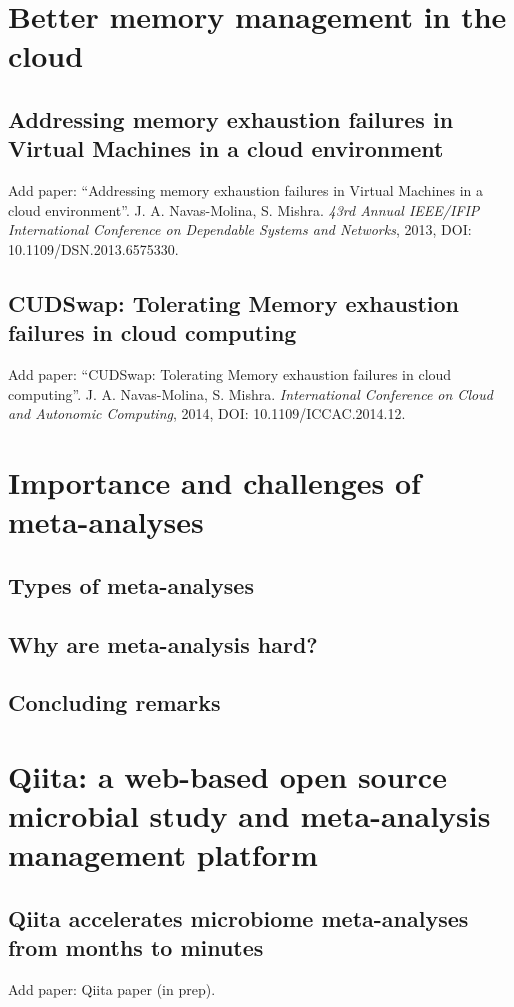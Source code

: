 \documentclass[12pt,chapterheads]{ucsd}
\begin{document}
\chapter{Better memory management in the cloud}\label{chapter_cudswap}
\glsresetall
% 
% 
\section{Addressing memory exhaustion failures in Virtual Machines in a cloud environment}\label{section_memory_exhaustion}
Add paper: ``Addressing memory exhaustion failures in Virtual Machines in a cloud environment''. J. A. Navas-Molina, S. Mishra. \emph{43rd Annual IEEE/IFIP International Conference on Dependable Systems and Networks}, 2013, DOI: 10.1109/DSN.2013.6575330.
\section{CUDSwap: Tolerating Memory exhaustion failures in cloud computing}\label{section_cudswap}
Add paper: ``CUDSwap: Tolerating Memory exhaustion failures in cloud computing''. J. A. Navas-Molina, S. Mishra. \emph{International Conference on Cloud and Autonomic Computing}, 2014, DOI: 10.1109/ICCAC.2014.12.

\chapter{Importance and challenges of meta-analyses}\label{chapter_meta}
\glsresetall
\section{Types of meta-analyses}\label{section_meta}
\section{Why are meta-analysis hard?}\label{section_meta_hard}
\section{Concluding remarks}\label{section_meta_conclusion}

\chapter{Qiita: a web-based open source microbial study and meta-analysis management platform}\label{chapter_qiita}
\glsresetall
\section{Qiita accelerates microbiome meta-analyses from months to minutes}\label{section_qiita}
Add paper: Qiita paper (in prep).
\end{document}
